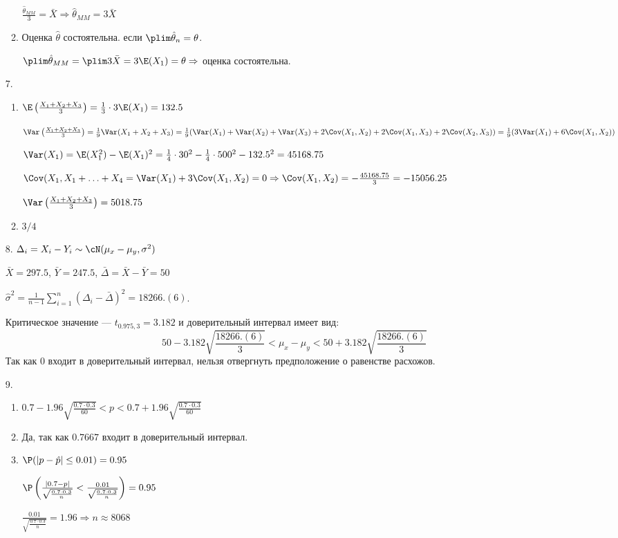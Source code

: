 \begin{enumerate}
\begin{enumerate}
$\frac{\hat \theta_{MM}}{3} = \bar X \Rightarrow \hat \theta_{MM} = 3 \bar X$
\item Оценка $\hat \theta$ состоятельна. если $\plim \hat \theta_n = \theta$.

$\plim \hat \theta_{MM} = \plim 3 \bar X = 3 \E(X_1) = \theta \Rightarrow$ оценка состоятельна.
\end{enumerate}
\item[7.]
\begin{enumerate}
\item $\E\left(\frac{X_1 + X_2 + X_3}{3} \right) = \frac{1}{3} \cdot 3 \E(X_1) = 132.5$

$\Var\left(\frac{X_1 + X_2 + X_3}{3} \right) = \frac{1}{9} \Var(X_1 + X_2 + X_3) =
\frac{1}{9} (\Var(X_1) + \Var(X_2) + \Var(X_3) + 2 \Cov(X_1, X_2) + 2\Cov(X_1, X_3) + 2\Cov(X_2, X_3)) =
\frac{1}{9}(3\Var(X_1) + 6\Cov(X_1,X_2))$

$\Var(X_1) = \E(X_1^2) - \E(X_1)^2 = \frac{1}{4} \cdot 30^2 - \frac{1}{4} \cdot 500^2 - 132.5^2 = 45168.75$

$\Cov(X_1, X_1 + \ldots + X_4 = \Var(X_1) + 3\Cov(X_1,X_2) = 0 \Rightarrow \Cov(X_1,X_2) = -\frac{45168.75}{3} = -15056.25$

$\Var\left(\frac{X_1 + X_2 + X_3}{3} \right) = 5018.75$

\item $3/4$
\end{enumerate}
\item[8.] $\Delta_i = X_i - Y_i \sim \cN(\mu_x - \mu_y, \sigma^2)$

$\bar X = 297.5$, $\bar Y = 247.5$, $\bar \Delta = \bar X - \bar Y = 50$

$\hat \sigma^2 = \frac{1}{n-1} \sum_{i=1}^n (\Delta_i - \bar \Delta)^2 = 18266.(6)$.

Критическое значение — $t_{0.975, 3} = 3.182$ и доверительный интервал имеет вид:
\[
50 - 3.182 \sqrt{\frac{18266.(6)}{3}} < \mu_x - \mu_y < 50 + 3.182 \sqrt{\frac{18266.(6)}{3}}
\]
Так как $0$ входит в доверительный интервал, нельзя отвергнуть предположение о равенстве расхожов.
\item[9.]
\begin{enumerate}
\item $0.7 - 1.96 \sqrt{\frac{0.7 \cdot 0.3}{60}} < p < 0.7 + 1.96 \sqrt{\frac{0.7 \cdot 0.3}{60}} $
\item Да, так как $0.7667$ входит в доверительный интервал.
\item $\P(|p - \hat p| \leq 0.01) = 0.95$

$\P\left(\frac{|0.7 - p|}{\sqrt{\frac{0.7 \cdot 0.3}{n}}} < \frac{0.01}{\sqrt{\frac{0.7 \cdot 0.3}{n}}} \right) = 0.95$

$\frac{0.01}{\sqrt{\frac{0.7 \cdot 0.3}{n}}} = 1.96 \Rightarrow n \approx 8068$
\end{enumerate}
\end{enumerate}




